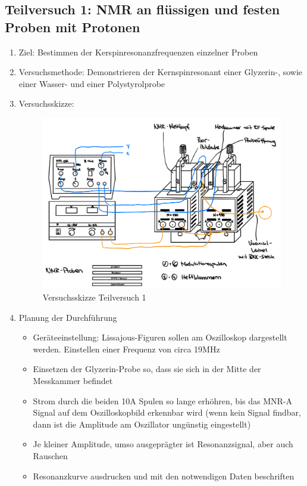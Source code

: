 \documentclass{article}
\begin{document}
\subsection{Teilversuch 1: NMR an flüssigen und festen Proben mit Protonen}
\begin{enumerate}[label = (\Roman*)]
    \item Ziel: Bestimmen der Kerspinresonanzfrequenzen einzelner Proben
    
    \item Versuchsmethode: Demonstrieren der Kernspinresonant einer Glyzerin-, sowie einer Wasser- und einer Polystyrolprobe
    
    \item Versuchsskizze:
    
        \begin{figure}[H]
        \centering
        \includegraphics[width=0.7\linewidth]{Abbildungen/TV1-5.jpeg}
        \caption{Versuchsskizze Teilversuch 1}
        \end{figure}

    \item Planung der Durchführung
        \begin{itemize}
            \item Geräteeinstellung: Lissajous-Figuren sollen am Oszilloskop dargestellt werden. Einstellen einer Frequenz von circa 19MHz
            \item Einsetzen der Glyzerin-Probe so, dass sie sich in der Mitte der Messkammer befindet
            \item Strom durch die beiden 10A Spulen so lange erhöhren, bis das MNR-A Signal auf dem Oszilloskopbild erkennbar wird (wenn kein Signal findbar, dann ist die Amplitude am Oszillator ungünstig eingestellt) 
            \item Je kleiner Amplitude, umso ausgeprägter ist Resonanzsignal, aber auch Rauschen
            \item Resonanzkurve ausdrucken und mit den notwendigen Daten beschriften
        \end{itemize}


\end{enumerate}
\end{document}
